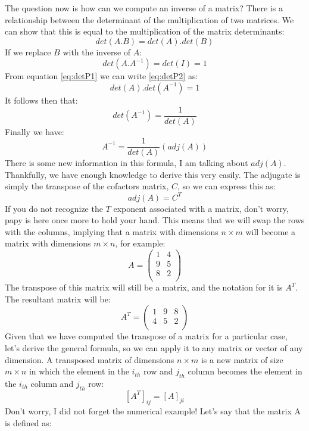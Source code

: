 \documentclass[600paper, 11pt,twoside,openany]{kdp}
\begin{document}
\par 
\vspace{-3pt}
\indent The question now is how can we compute an inverse of a matrix? There is a relationship between the determinant of the multiplication of two matrices. We can show that this is equal to the multiplication of the matrix determinants:
\begin{equation}\label{eq:detP1}
det(A.B) = det(A).det(B)
\end{equation}
\indent If we replace $B$ with the inverse of $A$:
\begin{equation}\label{eq:detP2}
det(A.A^{-1}) = det(I) = 1
\end{equation}
\indent From equation \ref{eq:detP1} we can write \ref{eq:detP2} as:
\[ det(A).det(A^{-1}) = 1 \]
\indent It follows then that:
\[det(A^{-1}) =  \frac{1}{det(A)}\]
\indent Finally we have:
\[A^{-1} =  \frac{1}{det(A)}(adj(A))\]
\indent There is some new information in this formula, I am talking about $adj(A)$. Thankfully, we have enough knowledge to derive this very easily. The adjugate is simply the transpose of the cofactors matrix, $C$, so we can express this as:
\[adj(A) = C^T\]
\indent If you do not recognize the $T$ exponent associated with a matrix, don’t worry, papy is here once more to hold your hand. This means that we will swap the rows with the columns, implying that a matrix with dimensions $n \times m$ will become a matrix with dimensions $m \times n$, for example:
\[A =
\begin{pmatrix}
1 & 4 \\
9 & 5  \\
8 & 2  \\
\end{pmatrix}
\]
\indent The transpose of this matrix will still be a matrix, and the notation for it is $A^T$. The resultant matrix will be:
\[A^T = \begin{pmatrix}
1 & 9 & 8  \\
4 & 5 & 2  \\
\end{pmatrix}
\]
\indent Given that we have computed the transpose of a matrix for a particular case, let’s derive the general formula, so we can apply it to any matrix or vector of any dimension. A transposed matrix of dimensions $n \times m$ is a new matrix of size $m \times n$ in which the element in the $i_{th}$ row and $j_{th}$ column becomes the element in the $i_{th}$ column and $j_{th}$ row:
\[\left[ A^T \right]_{ij} =  \left[A \right]_{ji}\]
\indent Don’t worry, I did not forget the numerical example! Let’s say that the matrix A is defined as:
\end{document}
